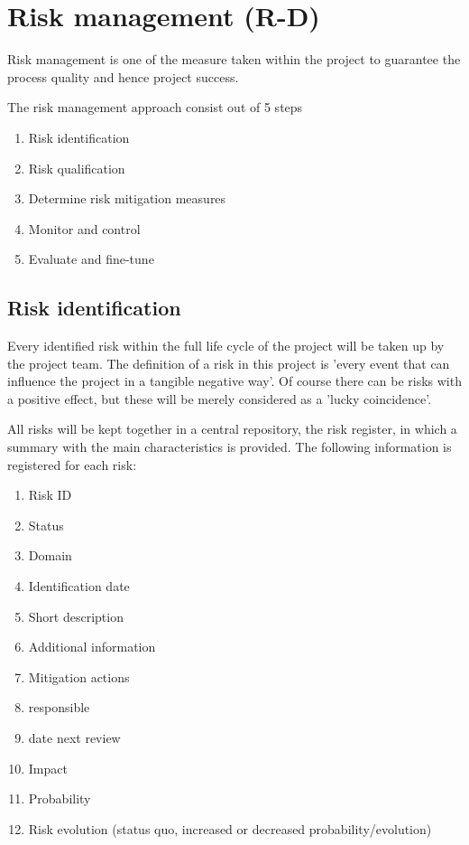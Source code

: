 \section{Risk management (R-D)}
\label{sec:risk-management}
Risk management is one of the measure taken within the project to guarantee the process quality and hence project success.

The risk management approach consist out of 5 steps

\begin{enumerate}
	\item Risk identification 
	\item Risk qualification
	\item Determine risk mitigation measures
	\item Monitor and control
	\item Evaluate and fine-tune
\end {enumerate}
\subsection{Risk identification }
Every identified risk within the full life cycle of the project will be taken up by the project team. The definition of a risk in this project is  'every event that can influence the project in a tangible negative way'. Of course there can be risks with a positive effect, but these will be merely considered as a 'lucky coincidence'.

All risks will be kept together in a central repository, the risk register, in which a summary with the main characteristics is provided.
The following information is registered for each risk:

\begin{enumerate}
	\item Risk ID
	\item Status
	\item Domain
	\item Identification date
	\item Short description
	\item Additional information
	\item Mitigation actions
	\item responsible
	\item date next review
	\item Impact
	\item Probability
	\item Risk evolution (status quo, increased or decreased probability/evolution)
\end {enumerate}

